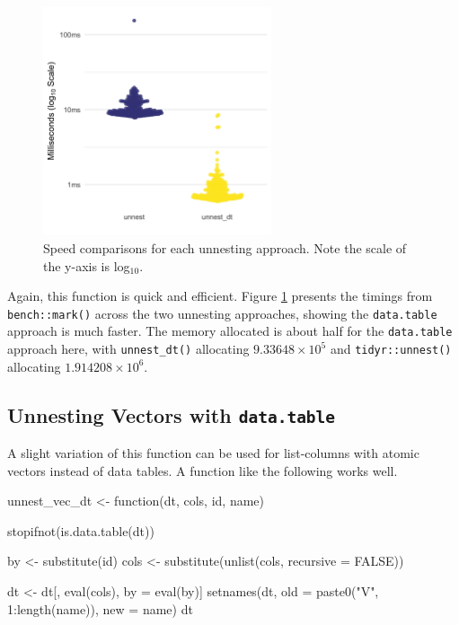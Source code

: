 \begin{figure}[tb]
  \centering
  \includegraphics[width=0.6\textwidth]{timings_unnest_manuscript.png}
  \caption{Speed comparisons for each unnesting approach. Note the scale of the y-axis is log$_{10}$.}
  \label{speed2}
\end{figure}

Again, this function is quick and efficient. Figure \ref{speed2}
presents the timings from \texttt{bench::mark()} across the two
unnesting approaches, showing the \texttt{data.table} approach is much
faster. The memory allocated is about half for the \texttt{data.table}
approach here, with \texttt{unnest\_dt()} allocating
\ensuremath{9.33648\times 10^{5}} and \texttt{tidyr::unnest()}
allocating \ensuremath{1.914208\times 10^{6}}.

\hypertarget{unnesting-vectors-with-data.table}{%
\subsection{\texorpdfstring{Unnesting Vectors with
\texttt{data.table}}{Unnesting Vectors with data.table}}\label{unnesting-vectors-with-data.table}}

A slight variation of this function can be used for list-columns with
atomic vectors instead of data tables. A function like the following
works well.

\begin{Schunk}
\begin{Sinput}
unnest_vec_dt <- function(dt, cols, id, name){
  stopifnot(is.data.table(dt))
  
  by <- substitute(id)
  cols <- substitute(unlist(cols, 
                            recursive = FALSE))
  
  dt <- dt[, eval(cols), by = eval(by)]
  setnames(dt, old = paste0("V", 1:length(name)), new = name)
  dt
}
\end{Sinput}
\end{Schunk}

